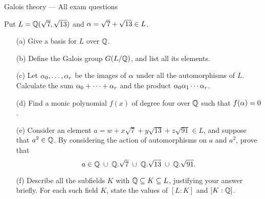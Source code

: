 \documentclass[a4paper]{article}
\begin{document}
\begin{center}
 {\Huge Galois theory --- All exam questions}
\end{center}
\vspace{4ex}

\begin{problem}%
 Put $L={\mathbb{Q}}(\sqrt{7},\sqrt{13})$ and $\alpha=\sqrt{7}+\sqrt{13}\in L$.
 \begin{itemize}
  \item[(a)] Give a basis for $L$ over ${\mathbb{Q}}$. 
  \item[(b)] Define the Galois group $G(L/{\mathbb{Q}})$, and list all its
   elements.   
  \item[(c)] Let $\alpha_0,\dotsc,\alpha_r$ be the images of $\alpha$ under all
   the automorphisms of $L$.  Calculate the sum $\alpha_0+\dotsb+\alpha_r$
   and the product $\alpha_0\alpha_1\dotsb\alpha_r$. 
  \item[(d)] Find a monic polynomial $f(x)$ of degree four over ${\mathbb{Q}}$
   such that $f(\alpha)=0$.  
  \item[(e)] Consider an element
   $a=w+x\sqrt{7}+y\sqrt{13}+z\sqrt{91}\in L$, and suppose that
   $a^2\in{\mathbb{Q}}$.  By considering the action of automorphisms on $a$ and
   $a^2$, prove that 
   \[ a\in {\mathbb{Q}}\;\cup\; {\mathbb{Q}}.\sqrt{7} \;\cup\; {\mathbb{Q}}.\sqrt{13} \;\cup\; {\mathbb{Q}}.\sqrt{91}.
   \]
  \item[(f)] Describe all the subfields $K$ with ${\mathbb{Q}}\subseteq K\subseteq L$,
   justifying your answer briefly.  For each such field $K$, state the
   values of $[L:K]$ and $[K:{\mathbb{Q}}]$. 
 \end{itemize}
\end{problem}
\end{document}
